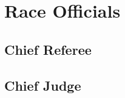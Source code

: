 \section{Race Officials}
\label{role:officials}

\subsection{Chief Referee}
\label{role:chief_ref}

\subsection{Chief Judge}
\label{role:chief_judge}
